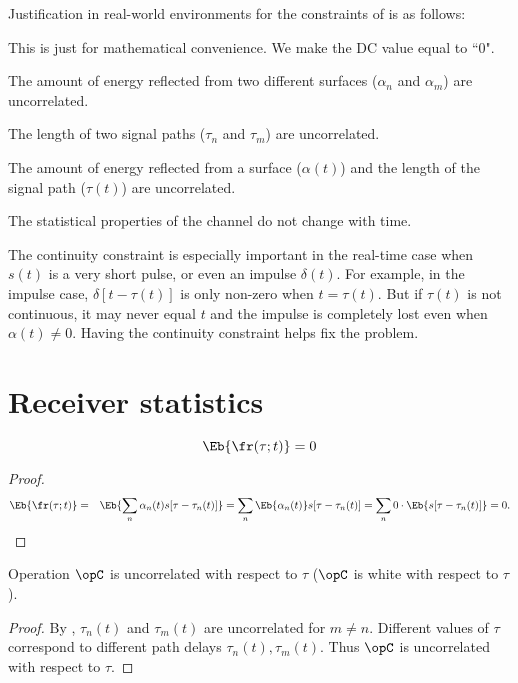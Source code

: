 Justification in real-world environments 
for the constraints of  is as follows:
\begin{enume}
  \item This is just for mathematical convenience.
        We make the DC value equal to ``0".
  \item The amount of energy reflected from two different surfaces
        ($\alpha_n$ and $\alpha_m$) are uncorrelated.
  \item The length of two signal paths ($\tau_n$ and $\tau_m$) 
        are uncorrelated.
  \item The amount of energy reflected from a surface ($\alpha(t)$)
        and the length of the signal path ($\tau(t)$) are 
        uncorrelated.
  \item The statistical properties of the channel do not change with time.
  \item The continuity constraint is especially important in the real-time
case when $s(t)$ is a very short pulse, or even an impulse $\delta(t)$.
For example, in the impulse case, $\delta[t-\tau(t)]$ is only non-zero
when $t=\tau(t)$. But if $\tau(t)$ is not continuous, it may never equal $t$
and the impulse is completely lost even when $\alpha(t)\ne0$. 
Having the continuity constraint helps fix the problem.
  \end{enume}

\section{Receiver statistics}
\begin{proposition}
\[\Eb{\fr(\tau;t)} = 0 \]
\end{proposition}
\begin{proof}
\begin{eqnarray*}
   \Eb{\fr(\tau;t)} 
     &=& \Eb{\sum_n \alpha_n(t)s[\tau-\tau_n(t)]}
      =  \sum_n \Eb{\alpha_n(t)}s[\tau-\tau_n(t)]
      =   \sum_n 0\cdot\Eb{s[\tau-\tau_n(t)]}
      =  0.
\end{eqnarray*}
\end{proof}

\begin{proposition}
\label{prop:mp_tau}
Operation $\opC$ is uncorrelated with respect to $\tau$
($\opC$ is white with respect to $\tau$).
\end{proposition}
\begin{proof}
By , 
$\tau_n(t)$ and $\tau_m(t)$ are uncorrelated for $m\not=n$.
Different values of $\tau$ correspond to different 
path delays $\tau_n(t),\tau_m(t)$.
Thus $\opC$ is uncorrelated with respect to $\tau$.
\end{proof}

